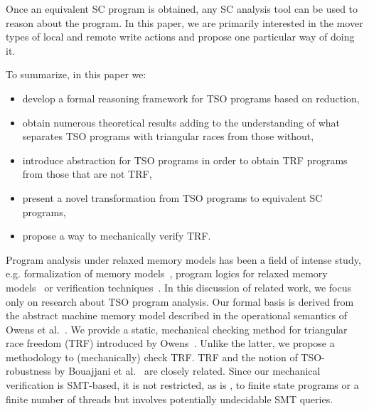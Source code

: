 \documentclass[preprint,9pt]{sigplanconf}
\begin{document}
Once an equivalent SC program is obtained, any SC analysis tool can be used to reason about the program.
In this paper, we are primarily interested in the mover types of local and remote write actions and propose one particular way of doing it.

To summarize, in this paper we:
\begin{itemize}
\item develop a formal reasoning framework for TSO programs based on reduction,
\item obtain numerous theoretical results adding to the understanding of what separates TSO programs with triangular races from those without,
\item introduce abstraction for TSO programs in order to obtain TRF programs from those that are not TRF,
\item present a novel transformation from TSO programs to equivalent SC programs,
\item propose a way to mechanically verify TRF.
\end{itemize}

Program analysis under relaxed memory models has been a field of intense study, e.g. formalization of memory models~\cite{BA2008,BOS+2011,HMS+2012,SSO+2010}, program logics for relaxed memory models~\cite{BDG2013,FFS2010,Rid2010,VN2013} or verification techniques~\cite{AKN+2013,BDM2013,BM2008,DMV+2013,ND2013}. 
In this discussion of related work, we focus only on research about TSO program analysis. %
Our formal basis is derived from the abstract machine memory model described in the operational semantics of Owens et al.~\cite{OSS2009}. 
We provide a static, mechanical checking method for triangular race freedom (TRF) introduced by Owens~\cite{Owe2010}. 
Unlike the latter, we propose a methodology to (mechanically) check TRF.
TRF and the notion of TSO-robustness by Bouajjani et al.~\cite{BDM2013} are closely related. 
Since our mechanical verification is SMT-based, it is not restricted, as is \cite{BDM2013}, to finite state programs or a finite number of threads but involves potentially undecidable SMT queries. 
\end{document}
